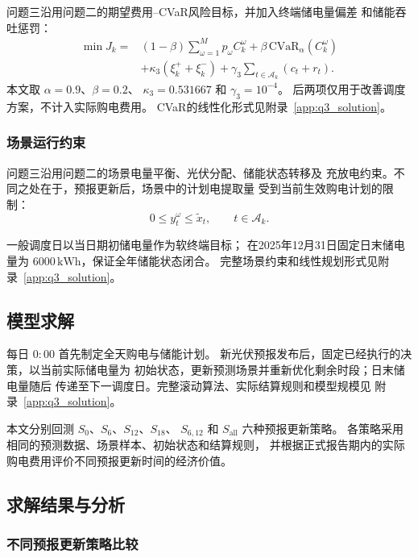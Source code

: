 问题三沿用问题二的期望费用--CVaR风险目标，并加入终端储电量偏差
和储能吞吐惩罚：
\begin{equation}
\begin{aligned}
\min J_k={}&
(1-\beta)\sum_{\omega=1}^{M}p_\omega C_k^\omega
+\beta\,\mathrm{CVaR}_{\alpha}\!\left(C_k^\omega\right)\\
&+\kappa_3(\xi_k^++\xi_k^-)
+\gamma_3\sum_{t\in\mathcal A_k}(c_t+r_t).
\end{aligned}
\label{eq:q3_objective}
\end{equation}
本文取 $\alpha=0.9$、$\beta=0.2$、
$\kappa_3=0.531667$ 和 $\gamma_3=10^{-4}$。
后两项仅用于改善调度方案，不计入实际购电费用。
CVaR的线性化形式见附录~\ref{app:q3_solution}。

\subsubsection{场景运行约束}

问题三沿用问题二的场景电量平衡、光伏分配、储能状态转移及
充放电约束。不同之处在于，预报更新后，场景中的计划电提取量
受到当前生效购电计划的限制：
\begin{equation}
0\leq y_t^\omega\leq\widetilde{x}_t,
\qquad t\in\mathcal A_k.
\label{eq:q3_extraction_limit}
\end{equation}

一般调度日以当日期初储电量作为软终端目标；
在2025年12月31日固定日末储电量为
$6000\,\mathrm{kWh}$，保证全年储能状态闭合。
完整场景约束和线性规划形式见附录~\ref{app:q3_solution}。

\subsection{模型求解}

每日 $0{:}00$ 首先制定全天购电与储能计划。
新光伏预报发布后，固定已经执行的决策，以当前实际储电量为
初始状态，更新预测场景并重新优化剩余时段；日末储电量随后
传递至下一调度日。完整滚动算法、实际结算规则和模型规模见
附录~\ref{app:q3_solution}。

本文分别回测 $S_0$、$S_6$、$S_{12}$、$S_{18}$、
$S_{6,12}$ 和 $S_{\mathrm{all}}$ 六种预报更新策略。
各策略采用相同的预测数据、场景样本、初始状态和结算规则，
并根据正式报告期内的实际购电费用评价不同预报更新时间的经济价值。
\subsection{求解结果与分析}

\subsubsection{不同预报更新策略比较}


